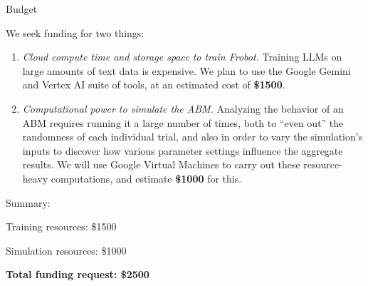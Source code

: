 \documentclass[12pt]{beamer}
\begin{document}
\begin{frame}[c]{Budget}

\small
We seek funding for two things:

\begin{enumerate}
\itemsep.5em
\footnotesize
\item \textsl{Cloud compute time and storage space to train Frobot.} Training LLMs on large amounts of text data is expensive. We plan to use the Google Gemini and Vertex AI suite of tools, at an estimated cost of \textbf{\$1500}.

\item \textsl{Computational power to simulate the ABM.} Analyzing the behavior of an ABM requires running it a large number of times, both to ``even out'' the randomness of each individual trial, and also in order to vary the simulation's inputs to discover how various parameter settings influence the aggregate results. We will use Google Virtual Machines to carry out these resource-heavy computations, and estimate \textbf{\$1000} for this.

\end{enumerate}

\normalsize
Summary:
\begin{compactenum}
\item Training resources: \$1500
\item Simulation resources: \$1000
\end{compactenum}
\begin{compactitem}
\item \textbf{Total funding request: \$2500}
\end{compactitem}



\end{frame}
\end{document}
